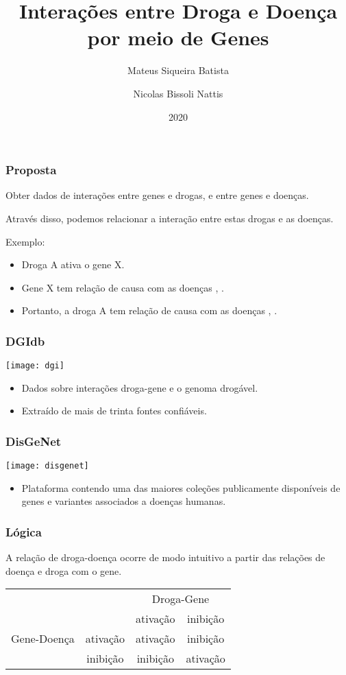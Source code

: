 \documentclass[12pt]{beamer}
\title{Interações entre Droga e Doença por meio de Genes}
\author{
  Mateus Siqueira Batista\and
  Nicolas Bissoli Nattis
}
\institute{
  MC536 - Instituto de Computação, UNICAMP
}
\date[2020]{2020}
\begin{document}
\frame{\titlepage}

\begin{frame}
  \frametitle{Proposta}
  Obter dados de interações entre genes e drogas, e entre genes e doenças.
  \pause

  Através disso, podemos relacionar a interação entre estas drogas e as doenças.
  \pause

  \begin{block}{Exemplo:}
    \begin{itemize}
      \item Droga A ativa o gene X.
      \item Gene X tem relação de causa com as doenças \textalpha, \textgamma.
      \item Portanto, a droga A tem relação de causa com as doenças \textalpha, \textgamma.
    \end{itemize}
  \end{block}
\end{frame}

\begin{frame}
  \frametitle{DGIdb}
  \centering
  \texttt{[image: dgi]}
  \vspace*{1 cm}
  \begin{itemize}
    \item Dados sobre interações droga-gene e o genoma drogável.
    \item Extraído de mais de trinta fontes confiáveis.
  \end{itemize}
\end{frame}

\begin{frame}
  \frametitle{DisGeNet}
  \centering
  \texttt{[image: disgenet]}
  \vspace*{1 cm}
  \begin{itemize}
    \item Plataforma contendo uma das maiores coleções publicamente disponíveis
          de genes e variantes associados a doenças humanas.
  \end{itemize}
\end{frame}

\begin{frame}[fragile]
  \frametitle{Lógica}

  A relação de droga-doença ocorre de modo intuitivo a partir das relações de
  doença e droga com o gene.

  \vspace*{0.1cm}

  \begin{tabular}{| c c | c c |}
    \hline
    & & \multicolumn{2}{c|}{Droga-Gene} \\
    & & ativação & inibição \\
    \hline
    Gene-Doença & ativação & ativação & inibição \\
    & inibição & inibição & ativação \\
    \hline
  \end{tabular}

\end{frame}
\end{document}
